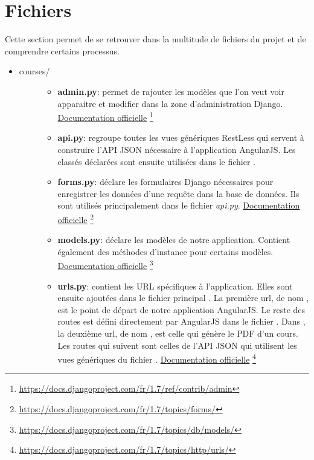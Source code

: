 \documentclass[letterpaper,10pt,oneside]{sphinxmanual}
\begin{document}
\section{Fichiers}
\label{guide:fichiers}
Cette section permet de se retrouver dans la multitude de fichiers du projet et de comprendre certains processus.
\begin{itemize}
\item {} \begin{description}
\item[{courses/}] \leavevmode\begin{itemize}
\item {} 
\textbf{admin.py}: permet de rajouter les modèles que l'on veut voir apparaitre et modifier dans la zone d'administration Django. \href{https://docs.djangoproject.com/fr/1.7/ref/contrib/admin/}{Documentation officielle} \footnote{
\href{https://docs.djangoproject.com/fr/1.7/ref/contrib/admin}{https://docs.djangoproject.com/fr/1.7/ref/contrib/admin}
}

\item {} 
\textbf{api.py}: regroupe toutes les vues génériques RestLess qui servent à construire l'API JSON nécessaire à l'application AngularJS. Les classés déclarées sont ensuite utilisées dans le fichier .

\item {} 
\textbf{forms.py}: déclare les formulaires Django nécessaires pour enregistrer les données d'une requête dans la base de données. Ils sont utilisés principalement dans le fichier \emph{api.py}. \href{https://docs.djangoproject.com/fr/1.7/topics/forms/}{Documentation officielle} \footnote{
\href{https://docs.djangoproject.com/fr/1.7/topics/forms/}{https://docs.djangoproject.com/fr/1.7/topics/forms/}
}

\item {} 
\textbf{models.py}: déclare les modèles de notre application. Contient également des méthodes d'instance pour certains modèles. \href{https://docs.djangoproject.com/fr/1.7/topics/db/models/}{Documentation officielle} \footnote{
\href{https://docs.djangoproject.com/fr/1.7/topics/db/models/}{https://docs.djangoproject.com/fr/1.7/topics/db/models/}
}

\item {} 
\textbf{urls.py}: contient les URL spécifiques à l'application. Elles sont ensuite ajoutées dans le fichier principal . La première url, de nom , est le point de départ de notre application AngularJS. Le reste des routes est défini directement par AngularJS dans le fichier . Dans , la deuxième url, de nom , est celle qui génère le PDF d'un cours. Les routes qui suivent sont celles de l'API JSON qui utilisent les vues génériques du fichier . \href{https://docs.djangoproject.com/fr/1.7/topics/http/urls/}{Documentation officielle} \footnote{
\href{https://docs.djangoproject.com/fr/1.7/topics/http/urls/}{https://docs.djangoproject.com/fr/1.7/topics/http/urls/}
}


\end{itemize}
\end{description}
\end{itemize}
\end{document}
